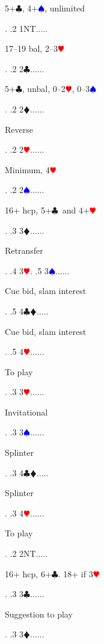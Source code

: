 \documentclass[a4paper]{article}
\newcommand{\BC}{\textcolor{OliveGreen}{$\clubsuit$}}
\newcommand{\BD}{\textcolor{RedOrange}{$\vardiamondsuit$}}
\newcommand{\BH}{\textcolor{Red}{$\varheartsuit${}}}
\newcommand{\BS}{\textcolor{Blue}{$\spadesuit${}}}
\begin{document}
{\begin{minipage}[t]{0.8\textwidth}
5+\BC , 4+\BS , unlimited
\end{minipage}. 
 .2 1NT.....\begin{minipage}[t]{0.8\textwidth}
17--19 bal, 2--3\BH 
\end{minipage}. 
 .2 2\BC......\begin{minipage}[t]{0.8\textwidth}
5+\BC , unbal, 0--2\BH , 0--3\BS 
\end{minipage}. 
 .2 2\BD......\begin{minipage}[t]{0.8\textwidth}
Reverse
\end{minipage}. 
 .2 2\BH......\begin{minipage}[t]{0.8\textwidth}
Minimum, 4\BH 
\end{minipage}. 
 .2 2\BS......\begin{minipage}[t]{0.8\textwidth}
16+ hcp, 5+\BC\ and 4+\BH 
\end{minipage}. 
 .3 3\BD......\begin{minipage}[t]{0.8\textwidth}
Retransfer
\end{minipage}. 
 .4 3\BH. 
 .5 3\BS......\begin{minipage}[t]{0.8\textwidth}
Cue bid, slam interest
\end{minipage}. 
 .5 4\BC\BD.....\begin{minipage}[t]{0.8\textwidth}
Cue bid, slam interest
\end{minipage}. 
 .5 4\BH......\begin{minipage}[t]{0.8\textwidth}
To play
\end{minipage}. 
 .3 3\BH......\begin{minipage}[t]{0.8\textwidth}
Invitational
\end{minipage}. 
 .3 3\BS......\begin{minipage}[t]{0.8\textwidth}
Splinter
\end{minipage}. 
 .3 4\BC\BD.....\begin{minipage}[t]{0.8\textwidth}
Splinter
\end{minipage}. 
 .3 4\BH......\begin{minipage}[t]{0.8\textwidth}
To play
\end{minipage}. 
 .2 2NT.....\begin{minipage}[t]{0.8\textwidth}
16+ hcp, 6+\BC {.} 18+ if 3\BH 
\end{minipage}. 
 .3 3\BC......\begin{minipage}[t]{0.8\textwidth}
Suggestion to play
\end{minipage}. 
 .3 3\BD......\begin{minipage}[t]{0.8\textwidth}

\end{minipage}}
\end{document}
